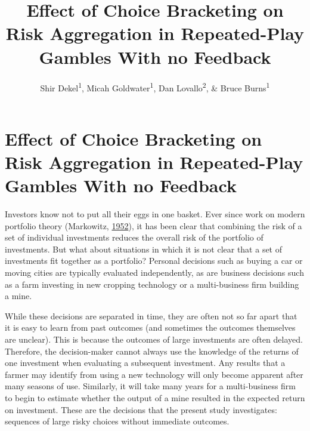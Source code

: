 \documentclass[
  english,
  man, donotrepeattitle,floatsintext]{apa7}
\title{Effect of Choice Bracketing on Risk Aggregation in Repeated-Play Gambles With no Feedback}
\author{Shir Dekel\textsuperscript{1}, Micah Goldwater\textsuperscript{1}, Dan Lovallo\textsuperscript{2}, \& Bruce Burns\textsuperscript{1}}
\date{}
\affiliation{\vspace{0.5cm}\textsuperscript{1} The University of Sydney, School of Psychology\\\textsuperscript{2} The University of Sydney, Business School}
\theoremstyle{definition}
\theoremstyle{definition}
\theoremstyle{definition}
\theoremstyle{definition}
\theoremstyle{remark}
\begin{document}
\maketitle





















\hypertarget{aggregation}{%
\section{Effect of Choice Bracketing on Risk Aggregation in Repeated-Play Gambles With no Feedback}\label{aggregation}}

Investors know not to put all their eggs in one basket. Ever since work on
modern portfolio theory (Markowitz, \protect\hyperlink{ref-markowitz1952}{1952}), it has been clear that combining the
risk of a set of individual investments reduces the overall risk of the
portfolio of investments. But what about situations in which it is not clear
that a set of investments fit together as a portfolio? Personal decisions such
as buying a car or moving cities are typically evaluated independently, as are
business decisions such as a farm investing in new cropping technology or a
multi-business firm building a mine.

While these decisions are separated in time, they are often not so far apart
that it is easy to learn from past outcomes (and sometimes the outcomes
themselves are unclear). This is because the outcomes of large investments are
often delayed. Therefore, the decision-maker cannot always use the knowledge of
the returns of one investment when evaluating a subsequent investment. Any
results that a farmer may identify from using a new technology will only become
apparent after many seasons of use. Similarly, it will take many years for a
multi-business firm to begin to estimate whether the output of a mine resulted
in the expected return on investment. These are the decisions that the present study
investigates: sequences of large risky choices without immediate outcomes.
\end{document}
